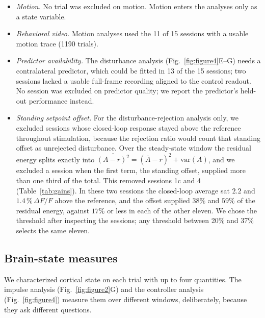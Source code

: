 \begin{itemize}
    \item \emph{Motion.} No trial was excluded on motion. Motion enters the
          analyses only as a state variable.
    \item \emph{Behavioral video.} Motion analyses used the 11 of 15 sessions
          with a usable motion trace (1190 trials).
    \item \emph{Predictor availability.} The disturbance analysis
          (Fig.~\ref{fig:figure4}E--G) needs a contralateral predictor, which
          could be fitted in 13 of the 15 sessions; two sessions lacked a usable
          full-frame recording aligned to the control readout. No session was
          excluded on predictor quality; we report the predictor's held-out
          performance instead.
    \item \emph{Standing setpoint offset.} For the disturbance-rejection analysis
          only, we excluded sessions whose closed-loop response stayed above the
          reference throughout stimulation, because the rejection ratio would
          count that standing offset as unrejected disturbance. Over the
          steady-state window the residual energy splits exactly into
          $\overline{(A-r)^{2}} = (\bar{A}-r)^{2} + \mathrm{var}(A)$, and we
          excluded a session when the first term, the standing offset, supplied
          more than one third of the total. This removed sessions 1c and 4
          (Table~\ref{tab:gains}). In these two sessions the closed-loop
          average sat $2.2$ and $1.4\,\%\,\Delta F/F$ above the reference, and the
          offset supplied $38\%$ and $59\%$ of the residual energy, against $17\%$ or
          less in each of the other eleven. We chose the threshold after inspecting the
          sessions; any threshold between 20\% and 37\% selects the same eleven.
\end{itemize}

\subsection*{Brain-state measures}
\label{sec:disturbance}

We characterized cortical state on each trial with up to four quantities. The
impulse analysis (Fig.~\ref{fig:figure2}G) and the controller analysis
(Fig.~\ref{fig:figure4}) measure them over different windows, deliberately,
because they ask different questions.

